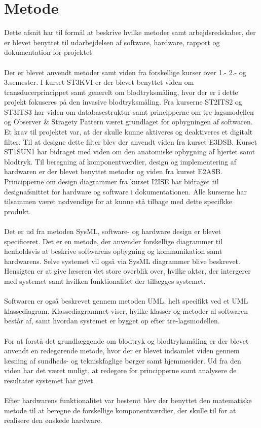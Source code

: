 \section{Metode}
Dette afsnit har til formål at beskrive hvilke metoder samt arbejdsredskaber, der er blevet benyttet til udarbejdelsen af software, hardware, rapport og dokumentation for projektet. 
\\\\
Der er blevet anvendt metoder samt viden fra forskellige kurser over 1.- 2.- og 3.semester. I kurset ST3KVI er der blevet benyttet viden om transducerprincippet samt generelt om blodtryksmåling, hvor der er i dette projekt fokuseres på den invasive blodtryksmåling. Fra kurserne ST2ITS2 og ST3ITS3 har viden om databasestruktur samt principperne om tre-lagsmodellen og Observer \& Stragety Pattern været grundlaget for opbygningen af softwaren. Et krav til projektet var, at der skulle kunne aktiveres og deaktiveres et digitalt filter. Til at designe dette filter blev der anvendt viden fra kurset E3DSB. Kurset ST1SUN1 har bidraget med viden om den anatomiske opbygning af hjertet samt blodtryk. Til beregning af komponentværdier, design og implementering af hardwaren er der blevet benyttet metoder og viden fra kurset E2ASB. Principperne om design diagrammer fra kurset I2ISE har bidraget til designafsnittet for hardware og software i dokumentationen. Alle kurserne har tilsammen været nødvendige for at kunne stå tilbage med dette specifkke produkt.
\\\\
Det er ud fra metoden SysML, software- og hardware design er blevet specificeret. Det er en metode, der anvender forskellige diagrammer til henholdsvis at beskrive softwarens opbygning og kommunikation samt hardwarens. Selve systemet vil også via SysML diagrammer blive beskrevet. Hensigten er at give læseren det store overblik over, hvilke aktør, der intergerer med systemet samt hvilken funktionalitet der tillægges systemet.
\\ \\
Softwaren er også beskrevet gennem metoden UML, helt specifikt ved et UML klassediagram. Klassediagrammet viser, hvilke klasser og metoder al softwaren består af, samt hvordan systemet er bygget op efter tre-lagsmodellen.
\\\\
For at forstå det grundlæggende om blodtryk og blodtryksmåling er der blevet anvendt en redegørende metode, hvor der er blevet indsamlet viden gennem læsning af sundheds- og tekniskfaglige børger samt hjemmesider. Ud fra den viden har det været muligt, at redegøre for principperne samt analysere de resultater systemet har givet.
\\\\
Efter hardwarens funktionalitet var bestemt blev der benyttet den matematiske metode til at beregne de forskellige komponentværdier, der skulle til for at realisere den ønskede hardware.

